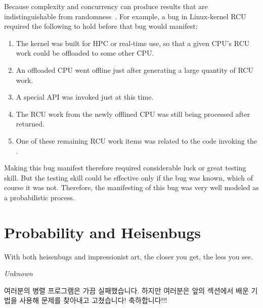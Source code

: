 {	Because complexity and concurrency can produce results that
	are indistinguishable from
	randomness~\cite{PeterOkech2009InherentRandomness}.
	For example, a bug in Linux-kernel RCU required the following
	to hold before that bug would manifest:
	\begin{enumerate}
	\item	The kernel was built for HPC or real-time use, so that
		a given CPU's RCU work could be offloaded to some other
		CPU\@.
	\item	An offloaded CPU went offline just after generating a
		large quantity of RCU work.
	\item	A special  API was invoked just at
		this time.
	\item	The RCU work from the newly offlined CPU was still being
		processed after  returned.
	\item	One of these remaining RCU work items was related to
		the code invoking the .
	\end{enumerate}
	Making this bug manifest therefore required considerable luck
	or great testing skill.
	But the testing skill could be effective only if the bug was
	known, which of course it was not.
	Therefore, the manifesting of this bug was very well modeled
	as a probabilistic process.

	\fi

}\QuickQuizEnd

\section{Probability and Heisenbugs}
\label{sec:debugging:Probability and Heisenbugs}
%
\epigraph{With both heisenbugs and impressionist art, the closer you
	  get, the less you see.}
	 {\emph{Unknown}}

여러분의 병렬 프로그램은 가끔 실패했습니다.
하지만 여러분은 앞의 섹션에서 배운 기법을 사용해 문제를 찾아내고 고쳤습니다!
축하합니다!!!

